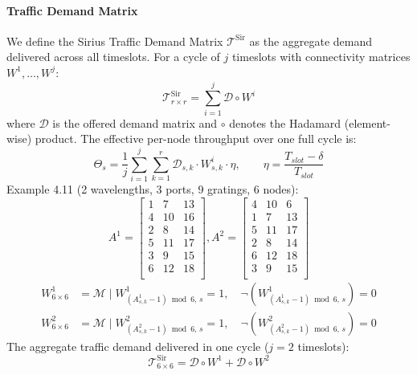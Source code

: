 \documentclass{article}
\begin{document}
    \paragraph{Traffic Demand Matrix}
    We define the Sirius Traffic Demand Matrix $\mathcal{T}^{\text{Sir}}$ as the aggregate demand delivered across all timeslots. For a cycle of $j$ timeslots with connectivity matrices $W^{1}, \ldots, W^{j}$:
    \[
        \mathcal{T}^{\text{Sir}}_{r \times r} = \sum_{i=1}^{j} \mathcal{D} \circ W^{i}
    \]
    where $\mathcal{D}$ is the offered demand matrix and $\circ$ denotes the Hadamard (element-wise) product. The effective per-node throughput over one full cycle is:
    \[
        \Theta_s = \frac{1}{j} \sum_{i=1}^{j} \sum_{k=1}^{r} \mathcal{D}_{s,k} \cdot W^{i}_{s,k} \cdot \eta, \qquad \eta = \frac{T_{slot} - \delta}{T_{slot}}
    \]
    Example 4.11 (2 wavelengths, 3 ports, 9 gratings, 6 nodes):
    \[
        A^{1} =
        \begin{bmatrix}
            1 & 7  & 13 \\
            4 & 10 & 16 \\
            2 & 8  & 14 \\
            5 & 11 & 17 \\
            3 & 9  & 15 \\
            6 & 12 & 18 \\
        \end{bmatrix}
        , A^{2} =
        \begin{bmatrix}
            4 & 10 & 6  \\
            1 & 7  & 13 \\
            5 & 11 & 17 \\
            2 & 8  & 14 \\
            6 & 12 & 18 \\
            3 & 9  & 15 \\
        \end{bmatrix}
    \]
    \begin{align*}
        W^{1}_{6 \times 6} &= \mathscr{M} \mid W^{1}_{(A^{1}_{s,k}-1) \bmod 6,\, s} = 1, \quad \neg(W^{1}_{(A^{1}_{s,k}-1) \bmod 6,\, s}) = 0 \\
        W^{2}_{6 \times 6} &= \mathscr{M} \mid W^{2}_{(A^{2}_{s,k}-1) \bmod 6,\, s} = 1, \quad \neg(W^{2}_{(A^{2}_{s,k}-1) \bmod 6,\, s}) = 0
    \end{align*}
    The aggregate traffic demand delivered in one cycle ($j=2$ timeslots):
    \[
        \mathcal{T}^{\text{Sir}}_{6 \times 6} = \mathcal{D} \circ W^{1} + \mathcal{D} \circ W^{2}
    \]
\end{document}
